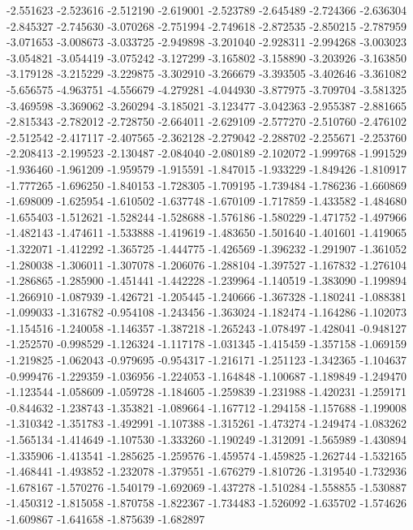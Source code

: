 -2.551623
-2.523616
-2.512190
-2.619001
-2.523789
-2.645489
-2.724366
-2.636304
-2.845327
-2.745630
-3.070268
-2.751994
-2.749618
-2.872535
-2.850215
-2.787959
-3.071653
-3.008673
-3.033725
-2.949898
-3.201040
-2.928311
-2.994268
-3.003023
-3.054821
-3.054419
-3.075242
-3.127299
-3.165802
-3.158890
-3.203926
-3.163850
-3.179128
-3.215229
-3.229875
-3.302910
-3.266679
-3.393505
-3.402646
-3.361082
-5.656575
-4.963751
-4.556679
-4.279281
-4.044930
-3.877975
-3.709704
-3.581325
-3.469598
-3.369062
-3.260294
-3.185021
-3.123477
-3.042363
-2.955387
-2.881665
-2.815343
-2.782012
-2.728750
-2.664011
-2.629109
-2.577270
-2.510760
-2.476102
-2.512542
-2.417117
-2.407565
-2.362128
-2.279042
-2.288702
-2.255671
-2.253760
-2.208413
-2.199523
-2.130487
-2.084040
-2.080189
-2.102072
-1.999768
-1.991529
-1.936460
-1.961209
-1.959579
-1.915591
-1.847015
-1.933229
-1.849426
-1.810917
-1.777265
-1.696250
-1.840153
-1.728305
-1.709195
-1.739484
-1.786236
-1.660869
-1.698009
-1.625954
-1.610502
-1.637748
-1.670109
-1.717859
-1.433582
-1.484680
-1.655403
-1.512621
-1.528244
-1.528688
-1.576186
-1.580229
-1.471752
-1.497966
-1.482143
-1.474611
-1.533888
-1.419619
-1.483650
-1.501640
-1.401601
-1.419065
-1.322071
-1.412292
-1.365725
-1.444775
-1.426569
-1.396232
-1.291907
-1.361052
-1.280038
-1.306011
-1.307078
-1.206076
-1.288104
-1.397527
-1.167832
-1.276104
-1.286865
-1.285900
-1.451441
-1.442228
-1.239964
-1.140519
-1.383090
-1.199894
-1.266910
-1.087939
-1.426721
-1.205445
-1.240666
-1.367328
-1.180241
-1.088381
-1.099033
-1.316782
-0.954108
-1.243456
-1.363024
-1.182474
-1.164286
-1.102073
-1.154516
-1.240058
-1.146357
-1.387218
-1.265243
-1.078497
-1.428041
-0.948127
-1.252570
-0.998529
-1.126324
-1.117178
-1.031345
-1.415459
-1.357158
-1.069159
-1.219825
-1.062043
-0.979695
-0.954317
-1.216171
-1.251123
-1.342365
-1.104637
-0.999476
-1.229359
-1.036956
-1.224053
-1.164848
-1.100687
-1.189849
-1.249470
-1.123544
-1.058609
-1.059728
-1.184605
-1.259839
-1.231988
-1.420231
-1.259171
-0.844632
-1.238743
-1.353821
-1.089664
-1.167712
-1.294158
-1.157688
-1.199008
-1.310342
-1.351783
-1.492991
-1.107388
-1.315261
-1.473274
-1.249474
-1.083262
-1.565134
-1.414649
-1.107530
-1.333260
-1.190249
-1.312091
-1.565989
-1.430894
-1.335906
-1.413541
-1.285625
-1.259576
-1.459574
-1.459825
-1.262744
-1.532165
-1.468441
-1.493852
-1.232078
-1.379551
-1.676279
-1.810726
-1.319540
-1.732936
-1.678167
-1.570276
-1.540179
-1.692069
-1.437278
-1.510284
-1.558855
-1.530887
-1.450312
-1.815058
-1.870758
-1.822367
-1.734483
-1.526092
-1.635702
-1.574626
-1.609867
-1.641658
-1.875639
-1.682897
